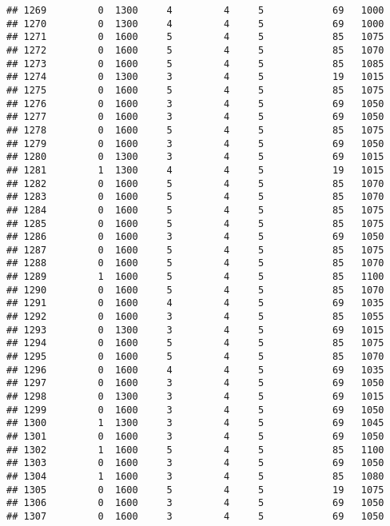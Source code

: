 \documentclass[]{article}
\begin{document}
\begin{verbatim}
## 1269         0  1300     4         4     5            69   1000
## 1270         0  1300     4         4     5            69   1000
## 1271         0  1600     5         4     5            85   1075
## 1272         0  1600     5         4     5            85   1070
## 1273         0  1600     5         4     5            85   1085
## 1274         0  1300     3         4     5            19   1015
## 1275         0  1600     5         4     5            85   1075
## 1276         0  1600     3         4     5            69   1050
## 1277         0  1600     3         4     5            69   1050
## 1278         0  1600     5         4     5            85   1075
## 1279         0  1600     3         4     5            69   1050
## 1280         0  1300     3         4     5            69   1015
## 1281         1  1300     4         4     5            19   1015
## 1282         0  1600     5         4     5            85   1070
## 1283         0  1600     5         4     5            85   1070
## 1284         0  1600     5         4     5            85   1075
## 1285         0  1600     5         4     5            85   1075
## 1286         0  1600     3         4     5            69   1050
## 1287         0  1600     5         4     5            85   1075
## 1288         0  1600     5         4     5            85   1070
## 1289         1  1600     5         4     5            85   1100
## 1290         0  1600     5         4     5            85   1070
## 1291         0  1600     4         4     5            69   1035
## 1292         0  1600     3         4     5            85   1055
## 1293         0  1300     3         4     5            69   1015
## 1294         0  1600     5         4     5            85   1075
## 1295         0  1600     5         4     5            85   1070
## 1296         0  1600     4         4     5            69   1035
## 1297         0  1600     3         4     5            69   1050
## 1298         0  1300     3         4     5            69   1015
## 1299         0  1600     3         4     5            69   1050
## 1300         1  1300     3         4     5            69   1045
## 1301         0  1600     3         4     5            69   1050
## 1302         1  1600     5         4     5            85   1100
## 1303         0  1600     3         4     5            69   1050
## 1304         1  1600     3         4     5            85   1080
## 1305         0  1600     5         4     5            19   1075
## 1306         0  1600     3         4     5            69   1050
## 1307         0  1600     3         4     5            69   1050

\end{verbatim}
\end{document}
